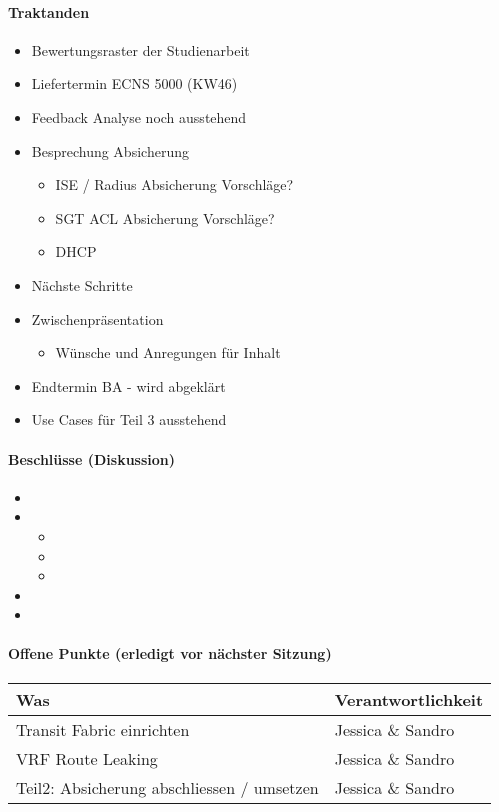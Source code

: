 \paragraph{Traktanden}
\begin{itemize}	
	\item Bewertungsraster der Studienarbeit
	\item Liefertermin ECNS 5000 (KW46)
	\item Feedback Analyse noch ausstehend
	\item Besprechung Absicherung
	\begin{itemize}
		\item ISE / Radius Absicherung Vorschläge?
		\item SGT ACL Absicherung Vorschläge?
		\item DHCP
	\end{itemize}
	\item Nächste Schritte
	\item Zwischenpräsentation 
	\begin{itemize}
		\item Wünsche und Anregungen für Inhalt
	\end{itemize}
	\item Endtermin BA - wird abgeklärt
	\item Use Cases für Teil 3 ausstehend
\end{itemize}

\paragraph{Beschlüsse (Diskussion)}
\begin{itemize}	
	\item 
	\item 
	\begin{itemize}
		\item 
		\item 
		\item 
	\end{itemize}
	\item 
	\item 
\end{itemize}

\paragraph{Offene Punkte (erledigt vor nächster Sitzung)} \mbox{}
\begin{table}[H]
	\centering
	\begin{tabularx}{\textwidth}{X | p{4.5cm}}
		\rowcolor{gray!50}
		\textbf{Was} & \textbf{Verantwortlichkeit} \\
		\hline	
		Transit Fabric einrichten & Jessica \& Sandro  \\
		VRF Route Leaking & Jessica \& Sandro \\
		Teil2: Absicherung abschliessen / umsetzen & Jessica \& Sandro \\
	\end{tabularx}
	\label{tab:my-label}
\end{table}

